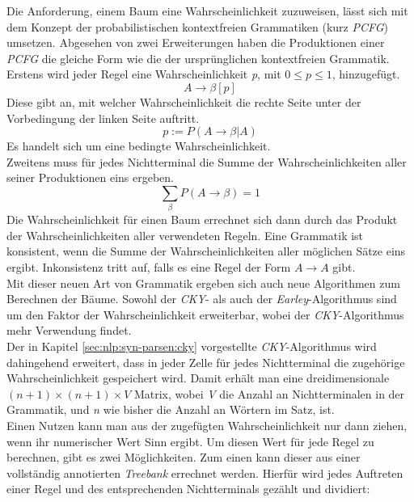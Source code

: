 Die Anforderung, einem Baum eine Wahrscheinlichkeit zuzuweisen, lässt sich mit dem Konzept der probabilistischen kontextfreien Grammatiken (kurz \textit{PCFG}) umsetzen. Abgesehen von zwei Erweiterungen haben die Produktionen einer \textit{PCFG} die gleiche Form wie die der ursprünglichen kontextfreien Grammatik. Erstens wird jeder Regel eine Wahrscheinlichkeit \textit{p}, mit \( 0 \leq p \leq 1 \), hinzugefügt.
\begin{equation}
A \to \beta  [p]
\end{equation}
Diese gibt an, mit welcher Wahrscheinlichkeit die rechte Seite unter der Vorbedingung der linken Seite auftritt.
\begin{equation}
p := P(A \to \beta | A)
\end{equation}
Es handelt sich um eine bedingte Wahrscheinlichkeit.\\ 
Zweitens muss für jedes Nichtterminal die Summe der Wahrscheinlichkeiten aller seiner Produktionen eins ergeben.
\begin{equation}
\sum_{\beta} P(A \to \beta) = 1
\end{equation}
Die Wahrscheinlichkeit für einen Baum errechnet sich dann durch das Produkt der Wahrscheinlichkeiten aller verwendeten Regeln. Eine Grammatik ist konsistent, wenn die Summe der Wahrscheinlichkeiten aller möglichen Sätze eins ergibt. Inkonsistenz tritt auf, falls es eine Regel der Form \( A \to A \) gibt.\\
Mit dieser neuen Art von Grammatik ergeben sich auch neue Algorithmen zum Berechnen der Bäume. Sowohl der \textit{CKY}- als auch der \textit{Earley}-Algorithmus sind um den Faktor der Wahrscheinlichkeit erweiterbar, wobei der \textit{CKY}-Algorithmus mehr Verwendung findet. \\
Der in Kapitel \ref{sec:nlp:syn-parsen:cky} vorgestellte \textit{CKY}-Algorithmus wird dahingehend erweitert, dass in jeder Zelle für jedes Nichtterminal die zugehörige Wahrscheinlichkeit gespeichert wird. Damit erhält man eine dreidimensionale \( (n+1) \times (n+1) \times V\) Matrix, wobei \textit{V} die Anzahl an Nichtterminalen in der Grammatik, und \textit{n} wie bisher die Anzahl an Wörtern im Satz, ist. \\
Einen Nutzen kann man aus der zugefügten Wahrscheinlichkeit nur dann ziehen, wenn ihr numerischer Wert Sinn ergibt. Um diesen Wert für jede Regel zu berechnen, gibt es zwei Möglichkeiten. Zum einen kann dieser aus einer vollständig annotierten \textit{Treebank} errechnet werden. Hierfür wird jedes Auftreten einer Regel und des entsprechenden Nichtterminals gezählt und dividiert: 
